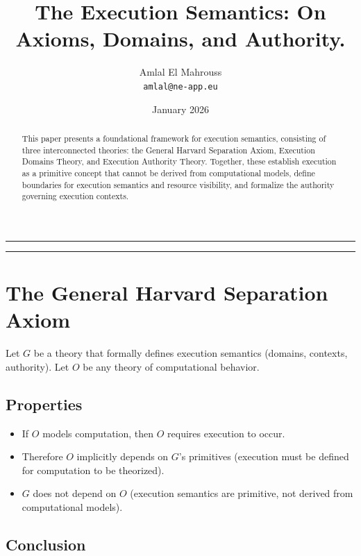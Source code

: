 \documentclass[11pt,a4paper]{article}
\title{The Execution Semantics: On Axioms, Domains, and Authority.}
\author{Amlal El Mahrouss\\
\texttt{amlal@ne-app.eu}}
\date{January 2026}
\begin{document}
\bf \maketitle

\begin{center}
	\rule[0.01cm]{17cm}{0.01cm}
\end{center}

\begin{abstract}
This paper presents a foundational framework for execution semantics, consisting of three interconnected theories: the General Harvard Separation Axiom, Execution Domains Theory, and Execution Authority Theory. Together, these establish execution as a primitive concept that cannot be derived from computational models, define boundaries for execution semantics and resource visibility, and formalize the authority governing execution contexts.
\end{abstract}

\begin{center}
	\rule[1cm]{17cm}{0.01cm}
\end{center}

\section{The General Harvard Separation Axiom}

Let $G$ be a theory that formally defines execution semantics (domains, contexts, authority). Let $O$ be any theory of computational behavior.

\subsection{Properties}

\begin{itemize}
    \item If $O$ models computation, then $O$ requires execution to occur.
    \item Therefore $O$ implicitly depends on $G$'s primitives (execution must be defined for computation to be theorized).
    \item $G$ does not depend on $O$ (execution semantics are primitive, not derived from computational models).
\end{itemize}

\subsection{Conclusion}
\end{document}
